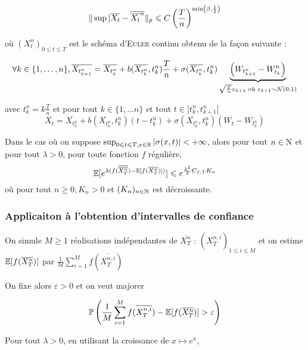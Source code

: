 \[ \Vert \sup \vert \xt - \overline{\xt^n} \Vert_p \leq C \left( \frac{T}{n} \right)^{\min\left(\beta, \frac{1}{2}\right)} \]

où $(X_t^n)_{0 \leq t \leq T}$ est le schéma d'\textsc{Euler} \og continu \fg{} obtenu de la façon suivante :

\newcommand{\xtkn}{\overline{X_{t_{k}^n}}}
\newcommand{\xtkpn}{\overline{X_{t_{k+1}^n}}}
\newcommand{\tkn}{t_k^n}
\newcommand{\tkpn}{t_{k+1}^n}

\[ \forall k \in \{ 1, \ldots, n \}, \xtkpn = \xtkn + b(\xtkn, t_k^n) \frac{T}{n} + \sigma(\xtkn, t_k^n)\underbrace{\left(W_{t_{k+1}^n} - W_{t_k}^n \right)}_{ \sqrt{ \frac{T}{n} } \varepsilon_{k+1} \text{ où } \varepsilon_{k+1} \sim \Normale(0,1) } \]


avec $t_k^n = k \frac{T}{n}$ et pour tout $k \in \{ 1, \ldots n \}$ et tout $t \in ] \tkn, \tkpn [$
  \renewcommand{\xt}{\overline{X_t}}
  \[ \xt = \xtkn + b(\xtkn, \tkn)(t -\tkn) + \sigma(\xtkn, \tkn) \left(W_t - W_{\tkn} \right) \]

  \newcommand{\xtn}{\overline{X_T^n}}
\begin{prop}
  Dans le cas où on suppose $\sup_{0 \leqslant t \leqslant T, x \in \mathbb{R}} \vert \sigma(x,t) \vert < +\infty$, alors pour tout $n \in \mathrm{N}$ et pour tout $\lambda > 0$, pour toute fonction $f$ régulière, 
  \[ \E[ e^{ \lambda(f(\overline{\xtn}) - \E[f (\xtn)])} ] \leq e^{ \frac{\lambda^2}{2}C_{f,T} K_n} \]
  où pour tout $n \geq 0, K_n > 0$ et $(K_n)_{n \in \mathrm{N}}$ est décroissante.
\end{prop}

\subsubsection{Applicaiton à l'obtention d'intervalles de confiance}

    On simule $M \geq 1$ réalisations indépendantes de $\xtn$ : $\left(\overline{X_T^{n,i}}\right)_{1 \leq i \leq M}$ et on estime $\E[f(\xtn)]$ par $ \frac{1}{M} \sum_{i=1}^M f(\overline{X_T^{n,i}})$

On fixe alors $\varepsilon > 0$ et on veut majorer

\renewcommand{\P}{\mathbb{P}}

\[ \P\left( \frac{1}{M} \sum_{i=1}^M f(\overline{X_T^{n,i}}) - \E[f(\xtn)] > \varepsilon \right) \]

Pour tout $\lambda > 0$, en utilisant la croissance de $x \mapsto e^x$,

